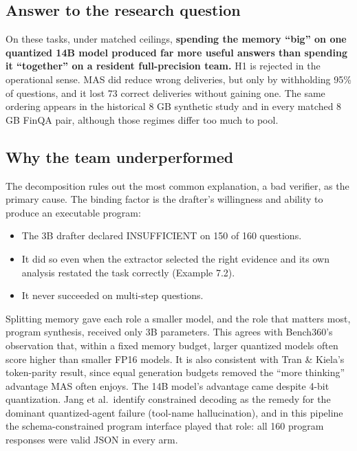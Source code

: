 \documentclass[letterpaper]{article}
\providecommand{\tightlist}{}
\begin{document}
\subsection{Answer to the research question}\label{answer-to-the-research-question}

On these tasks, under matched ceilings, \textbf{spending the memory ``big'' on one quantized 14B model produced far more useful answers than spending it ``together'' on a resident full-precision team.} H1 is rejected in the operational sense. MAS did reduce wrong deliveries, but only by withholding 95\% of questions, and it lost 73 correct deliveries without gaining one. The same ordering appears in the historical 8 GB synthetic study and in every matched 8 GB FinQA pair, although those regimes differ too much to pool.

\subsection{Why the team underperformed}\label{why-the-team-underperformed}

The decomposition rules out the most common explanation, a bad verifier, as the primary cause. The binding factor is the drafter's willingness and ability to produce an executable program:

\begin{itemize}
\tightlist
\item
  The 3B drafter declared INSUFFICIENT on 150 of 160 questions.
\item
  It did so even when the extractor selected the right evidence and its own analysis restated the task correctly (Example 7.2).
\item
  It never succeeded on multi-step questions.
\end{itemize}

Splitting memory gave each role a smaller model, and the role that matters most, program synthesis, received only 3B parameters. This agrees with Bench360's observation that, within a fixed memory budget, larger quantized models often score higher than smaller FP16 models. It is also consistent with Tran \& Kiela's token-parity result, since equal generation budgets removed the ``more thinking'' advantage MAS often enjoys. The 14B model's advantage came despite 4-bit quantization. Jang et al.~identify constrained decoding as the remedy for the dominant quantized-agent failure (tool-name hallucination), and in this pipeline the schema-constrained program interface played that role: all 160 program responses were valid JSON in every arm.
\end{document}
